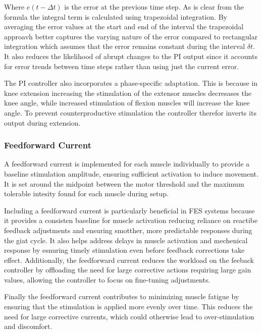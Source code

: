 Where \( e(t-\Delta t) \) is the error at the previous time step. As is clear from the formula the integral term is calculated using trapezoidal integration. By averaging the error values at the start and end of the interval the trapezoidal approavh better captures the varying nature of the error compared to rectangular integration which assumes that the error remains constant during the interval \(\delta t\). It also reduces the likelihood of abrupt changes to the PI output since it accounts for error trends between time steps rather than using just the current error.

The PI controller also incorporates a phase-specific adaptation. This is because in knee extension increasing the stimulation of the extensor muscles decresases the knee angle, while increased stimulation of flexion muscles will increase the knee angle. To prevent counterproductive stimulation the controller therefor inverts its output during extension.


\subsubsection{Feedforward Current}
A feedforward current is implemented for each muscle individually to provide a baseline stimulation amplitude, ensuring sufficient activation to induce movement. It is set around the midpoint between the motor threshold and the maximum tolerable intesity found for each muscle during setup. 


Including a feedforward current is particularly beneficial in FES systems because it provides a consisten baseline for muscle activation reducing reliance on reactibe feedback adjustments and ensuring smotther, more predictable responses during the giat cycle. It also helps address delays in muscle activation and mechenical response by esnuring timely stimulation even before feedback corrections take effect. Additionally, the feedforward current reduces the workload on the feeback controller by offloading the need for large corrective actions requiring large gain values, allowing the controller to focus on fine-tuning adjustments.

Finally the feedforward current contributes to minimizing muscle fatigue by ensuring that the stimulation is applied more evenly over time. This reduces the need for large corrective currents, which could otherwise lead to over-stimulation and discomfort.


